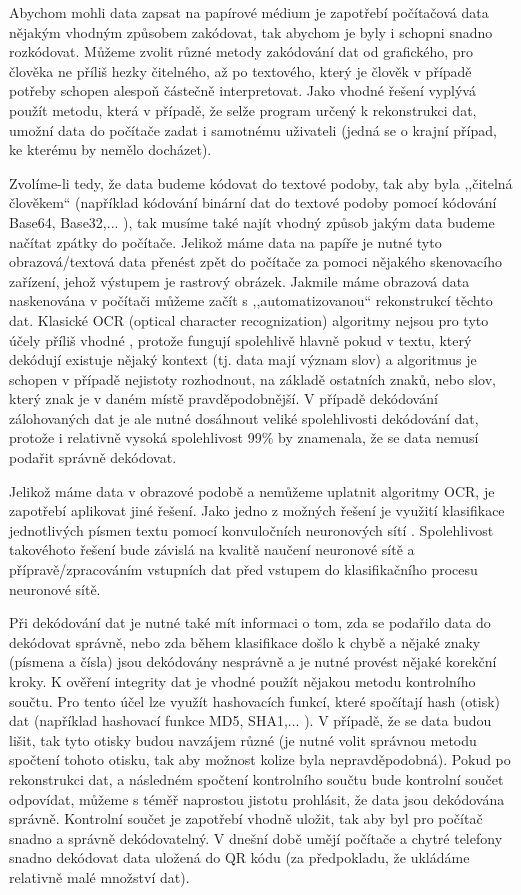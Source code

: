 \documentclass[conference]{IEEEtran}
\begin{document}
Abychom mohli data zapsat na papírové médium je zapotřebí počítačová data nějakým vhodným způsobem zakódovat, tak abychom je byly i schopni snadno rozkódovat. Můžeme zvolit různé metody zakódování dat od grafického, pro člověka ne příliš hezky čitelného, až po textového, který je člověk v případě potřeby schopen alespoň částečně interpretovat. Jako vhodné řešení vyplývá použít metodu, která v případě, že selže program určený k rekonstrukci dat, umožní data do počítače zadat i samotnému uživateli (jedná se o krajní případ, ke kterému by nemělo docházet). 

Zvolíme-li tedy, že data budeme kódovat do textové podoby, tak aby byla ,,čitelná člověkem`` (například kódování binární dat do textové podoby pomocí kódování Base64, Base32,... \cite{RFC4648}), tak musíme také najít vhodný způsob jakým data budeme načítat zpátky do počítače. Jelikož máme data na papíře je nutné tyto obrazová/textová data přenést zpět do počítače za pomoci nějakého skenovacího zařízení, jehož výstupem je rastrový obrázek. Jakmile máme obrazová data naskenována v počítači můžeme začít s ,,automatizovanou`` rekonstrukcí těchto dat. Klasické OCR (optical character recognization) algoritmy nejsou pro tyto účely příliš vhodné \cite{RecognizationVehicleLicencePlates}, protože fungují spolehlivě hlavně pokud v textu, který dekódují existuje nějaký kontext (tj. data mají význam slov) a algoritmus je schopen v případě nejistoty rozhodnout, na základě ostatních znaků, nebo slov, který znak je v daném místě pravděpodobnější. V případě dekódování zálohovaných dat je ale nutné dosáhnout veliké spolehlivosti dekódování dat, protože i relativně vysoká spolehlivost 99\% by znamenala, že se data nemusí podařit správně dekódovat.

Jelikož máme data v obrazové podobě a nemůžeme uplatnit algoritmy OCR, je zapotřebí aplikovat jiné řešení. Jako jedno z možných řešení je využití klasifikace jednotlivých písmen textu pomocí konvuločních neuronových sítí \cite{NIPS2010_4136}\cite{doi:10.1080/2150704X.2018.1526424}\cite{SEO2019328}. Spolehlivost takovéhoto řešení bude závislá na kvalitě naučení neuronové sítě a přípravě/zpracováním vstupních dat před vstupem do klasifikačního procesu neuronové sítě.

Při dekódování dat je nutné také mít informaci o tom, zda se podařilo data do dekódovat správně, nebo zda během klasifikace došlo k chybě a nějaké znaky (písmena a čísla) jsou dekódovány nesprávně a je nutné provést nějaké korekční kroky. K ověření integrity dat je vhodné použít nějakou metodu kontrolního součtu. Pro tento účel lze využít hashovacích funkcí, které spočítají hash (otisk) dat (například hashovací funkce MD5, SHA1,... \cite{RFC3174}). V případě, že se data budou lišit, tak tyto otisky budou navzájem různé (je nutné volit správnou metodu spočtení tohoto otisku, tak aby možnost kolize byla nepravděpodobná). Pokud po rekonstrukci dat, a následném spočtení kontrolního součtu bude kontrolní součet odpovídat, můžeme s téměř naprostou jistotu prohlásit, že data jsou dekódována správně. Kontrolní součet je zapotřebí vhodně uložit, tak aby byl pro počítač snadno a správně dekódovatelný. V dnešní době umějí počítače a chytré telefony snadno dekódovat data uložená do QR kódu (za předpokladu, že ukládáme relativně malé množství dat).
\end{document}
